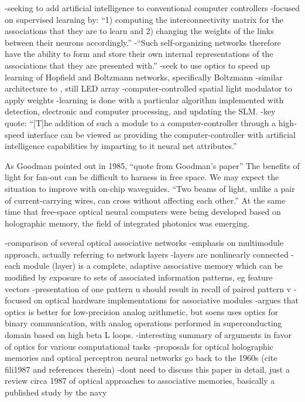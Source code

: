 \cite{fa1987}
-seeking to add artificial intelligence to conventional computer controllers
-focused on supervised learning by: ``1) computing the interconnectivity matrix for the associations that they are to learn and 2) changing the weights of the links between their neurons accordingly.''
-``Such self-organizing networks therefore have the ability to form and store their own internal representations of the associations that they are presented with.''
-seek to use optics to speed up learning of Hopfield and Boltzmann networks, specifically Boltzmann
-similar architecture to \cite{faps1985}, still LED array
-computer-controlled spatial light modulator to apply weights
-learning is done with a particular algorithm implemented with detection, electronic and computer processing, and updating the SLM.
-key quote: ``[T]he addition of such a module to a computer-controller through a high-speed interface can be viewed as providing the computer-controller with artificial intelligence capabilities by imparting to it neural net attributes.''














As Goodman pointed out in 1985, ``quote from Goodman's paper'' The benefits of light for fan-out can be difficult to harness in free space. We may expect the situation to improve with on-chip waveguides. ``Two beams of light, unlike a pair of current-carrying wires, can cross without affecting each other.'' \cite{abps1987} At the same time that free-space optical neural computers were being developed based on holographic memory, the field of integrated photonics was emerging.

\cite{fili1987}
-comparison of several optical associative networks
-emphasis on multimodule approach, actually referring to network layers
-layers are nonlinearly connected
-each module (layer) is a complete, adaptive associative memory which can be modified by exposure to sets of associated information patterns, eg feature vectors
-presentation of one pattern u should result in recall of paired pattern v
-focused on optical hardware implementations for associative modules
-argues that optics is better for low-precision analog arithmetic, but soens uses optics for binary communication, with analog operations performed in superconducting domain based on high beta L loops.
-interesting summary of arguments in favor of optics for various computational tasks
-proposals for optical holographic memories and optical perceptron neural networks go back to the 1960s (cite fili1987 and references therein)
-dont need to discuss this paper in detail, just a review circa 1987 of optical approaches to associative memories, basically a published study by the navy

